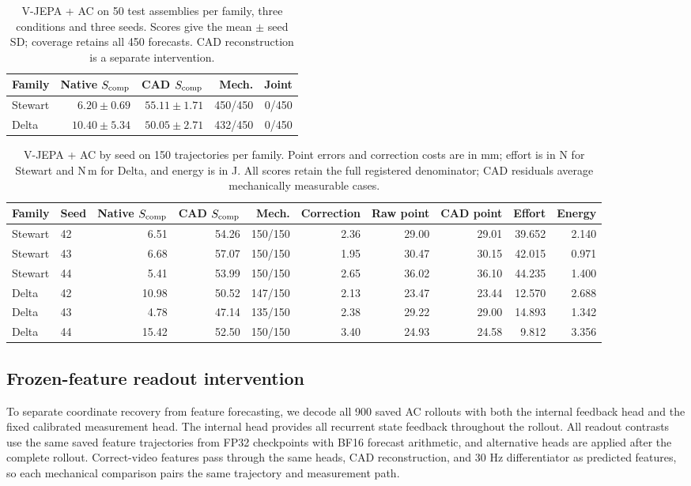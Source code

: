 \begin{table}[t]
\caption{V-JEPA + AC on 50 test assemblies per family, three conditions and three seeds. Scores give the mean $\pm$ seed SD; coverage retains all 450 forecasts. CAD reconstruction is a separate intervention.}
\label{app:spatial-ac-scores}
\centering\small
\begin{tabular}{lrrrr}
\toprule
Family & Native $S_{\rm comp}$ & CAD $S_{\rm comp}$ & Mech. & Joint\\
\midrule
Stewart & $6.20\!\pm\!0.69$ & $55.11\!\pm\!1.71$ & 450/450 & 0/450 \\
Delta & $10.40\!\pm\!5.34$ & $50.05\!\pm\!2.71$ & 432/450 & 0/450 \\
\bottomrule
\end{tabular}
\end{table}

\begin{table}[t]
\caption{V-JEPA + AC by seed on 150 trajectories per family. Point errors and correction costs are in mm; effort is in N for Stewart and N\,m for Delta, and energy is in J. All scores retain the full registered denominator; CAD residuals average mechanically measurable cases.}
\label{app:spatial-ac-seeds}
\centering\small
\setlength{\tabcolsep}{4pt}
\begin{tabular}{llrrrrrrrr}
\toprule
Family & Seed & Native $S_{\rm comp}$ & CAD $S_{\rm comp}$ & Mech. & Correction & Raw point & CAD point & Effort & Energy\\
\midrule
Stewart & 42 & 6.51 & 54.26 & 150/150 & 2.36 & 29.00 & 29.01 & 39.652 & 2.140 \\
Stewart & 43 & 6.68 & 57.07 & 150/150 & 1.95 & 30.47 & 30.15 & 42.015 & 0.971 \\
Stewart & 44 & 5.41 & 53.99 & 150/150 & 2.65 & 36.02 & 36.10 & 44.235 & 1.400 \\
Delta & 42 & 10.98 & 50.52 & 147/150 & 2.13 & 23.47 & 23.44 & 12.570 & 2.688 \\
Delta & 43 & 4.78 & 47.14 & 135/150 & 2.38 & 29.22 & 29.00 & 14.893 & 1.342 \\
Delta & 44 & 15.42 & 52.50 & 150/150 & 3.40 & 24.93 & 24.58 & 9.812 & 3.356 \\
\bottomrule
\end{tabular}
\end{table}

\subsection{Frozen-feature readout intervention}
\label{app:ac-readout}
To separate coordinate recovery from feature forecasting, we decode all 900 saved AC rollouts with both the internal feedback head and the fixed calibrated measurement head. The internal head provides all recurrent state feedback throughout the rollout. All readout contrasts use the same saved feature trajectories from FP32 checkpoints with BF16 forecast arithmetic, and alternative heads are applied after the complete rollout. Correct-video features pass through the same heads, CAD reconstruction, and 30 Hz differentiator as predicted features, so each mechanical comparison pairs the same trajectory and measurement path.

